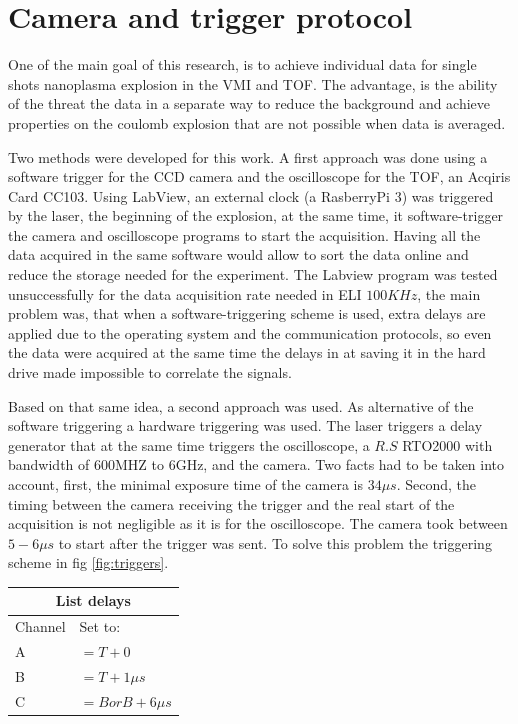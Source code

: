 \section{Camera and trigger protocol}

One of the main goal of this research, is to achieve individual data for single shots nanoplasma explosion in the VMI and TOF. The advantage, is the ability of the threat the data in a separate way to reduce the background and achieve  properties on the coulomb explosion that are not possible when data is averaged.

Two methods were developed for this work. A first approach was done using a software trigger for the CCD camera and the oscilloscope for the TOF, an Acqiris Card CC103. Using LabView, an external clock (a RasberryPi 3) was triggered by the laser, the beginning of the explosion,  at the same time, it software-trigger the camera and oscilloscope programs to start the acquisition. Having all the data acquired in the same software would allow to sort the data online and reduce the storage needed for the experiment. The Labview program was tested unsuccessfully for the data acquisition rate needed in ELI $100KHz$, the main problem was, that when a software-triggering scheme is used,  extra delays are applied due to the operating system and the communication protocols, so even the data were acquired at the same time the delays in at saving  it in the hard drive made impossible to correlate the signals.

Based on that same idea, a second approach was used. As alternative of the software triggering a hardware triggering was used. The laser triggers a delay generator that at the same time triggers the oscilloscope, a $R.S$ RTO2000 with bandwidth of 600MHZ to 6GHz,  and the camera. Two facts had to be taken into account, first, the minimal exposure time of the camera is $34\mu s$. Second, the timing between the camera receiving the trigger and the real start of the acquisition is not negligible as it is for the oscilloscope. The camera took between $5-6 \mu s$ to start after the trigger was sent. To solve this problem the triggering scheme in fig \ref{fig:triggers}.
\begin{table}[]
\label{tab:delaystriger}
\centering
\begin{tabular}{ll}
\multicolumn{2}{c}{List delays}                                          \\ \hline
\multicolumn{1}{|l|}{Channel} & \multicolumn{1}{l|}{Set to:}    \\ \hline
\multicolumn{1}{|l|}{A}                & \multicolumn{1}{l|}{$=T+0$}       \\ \hline
\multicolumn{1}{|l|}{B}                & \multicolumn{1}{l|}{$=T+1\mu s$}     \\ \hline
\multicolumn{1}{|l|}{C}                & \multicolumn{1}{l|}{$=B or B+6\mu s$} \\ \hline
\end{tabular}
\end{table}

